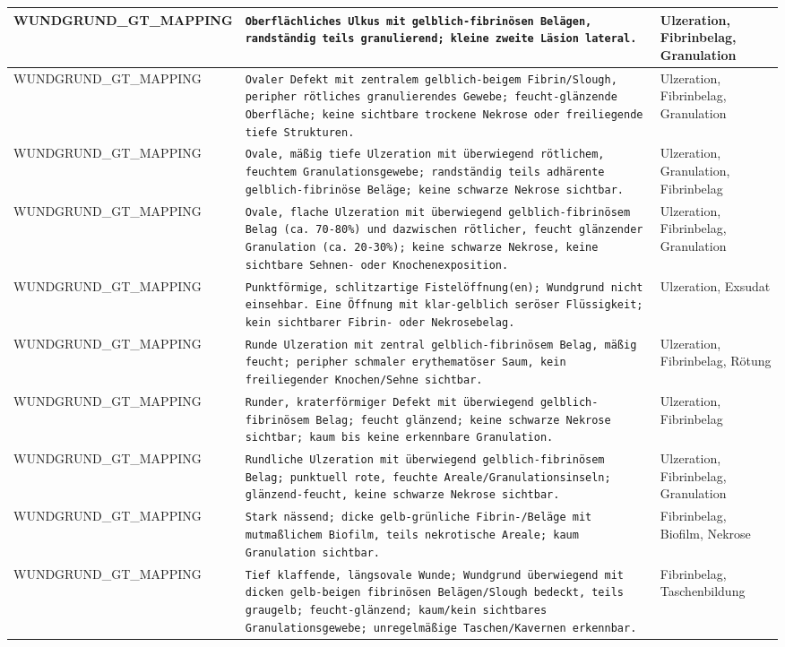 \begin{longtable}{|p{3.5cm}|p{5cm}|p{6.5cm}|}
WUNDGRUND\_GT\_MAPPING & \texttt{Oberflächliches Ulkus mit gelblich-fibrinösen Belägen, randständig teils granulierend; kleine zweite Läsion lateral.} & Ulzeration, Fibrinbelag, Granulation \\ \hline
WUNDGRUND\_GT\_MAPPING & \texttt{Ovaler Defekt mit zentralem gelblich-beigem Fibrin/Slough, peripher rötliches granulierendes Gewebe; feucht-glänzende Oberfläche; keine sichtbare trockene Nekrose oder freiliegende tiefe Strukturen.} & Ulzeration, Fibrinbelag, Granulation \\ \hline
WUNDGRUND\_GT\_MAPPING & \texttt{Ovale, mäßig tiefe Ulzeration mit überwiegend rötlichem, feuchtem Granulationsgewebe; randständig teils adhärente gelblich-fibrinöse Beläge; keine schwarze Nekrose sichtbar.} & Ulzeration, Granulation, Fibrinbelag \\ \hline
WUNDGRUND\_GT\_MAPPING & \texttt{Ovale, flache Ulzeration mit überwiegend gelblich-fibrinösem Belag (ca. 70-80\%) und dazwischen rötlicher, feucht glänzender Granulation (ca. 20-30\%); keine schwarze Nekrose, keine sichtbare Sehnen- oder Knochenexposition.} & Ulzeration, Fibrinbelag, Granulation \\ \hline
WUNDGRUND\_GT\_MAPPING & \texttt{Punktförmige, schlitzartige Fistelöffnung(en); Wundgrund nicht einsehbar. Eine Öffnung mit klar-gelblich seröser Flüssigkeit; kein sichtbarer Fibrin- oder Nekrosebelag.} & Ulzeration, Exsudat \\ \hline
WUNDGRUND\_GT\_MAPPING & \texttt{Runde Ulzeration mit zentral gelblich-fibrinösem Belag, mäßig feucht; peripher schmaler erythematöser Saum, kein freiliegender Knochen/Sehne sichtbar.} & Ulzeration, Fibrinbelag, Rötung \\ \hline
WUNDGRUND\_GT\_MAPPING & \texttt{Runder, kraterförmiger Defekt mit überwiegend gelblich-fibrinösem Belag; feucht glänzend; keine schwarze Nekrose sichtbar; kaum bis keine erkennbare Granulation.} & Ulzeration, Fibrinbelag \\ \hline
WUNDGRUND\_GT\_MAPPING & \texttt{Rundliche Ulzeration mit überwiegend gelblich-fibrinösem Belag; punktuell rote, feuchte Areale/Granulationsinseln; glänzend-feucht, keine schwarze Nekrose sichtbar.} & Ulzeration, Fibrinbelag, Granulation \\ \hline
WUNDGRUND\_GT\_MAPPING & \texttt{Stark nässend; dicke gelb-grünliche Fibrin-/Beläge mit mutmaßlichem Biofilm, teils nekrotische Areale; kaum Granulation sichtbar.} & Fibrinbelag, Biofilm, Nekrose \\ \hline
WUNDGRUND\_GT\_MAPPING & \texttt{Tief klaffende, längsovale Wunde; Wundgrund überwiegend mit dicken gelb-beigen fibrinösen Belägen/Slough bedeckt, teils graugelb; feucht-glänzend; kaum/kein sichtbares Granulationsgewebe; unregelmäßige Taschen/Kavernen erkennbar.} & Fibrinbelag, Taschenbildung \\ \hline

\end{longtable}
